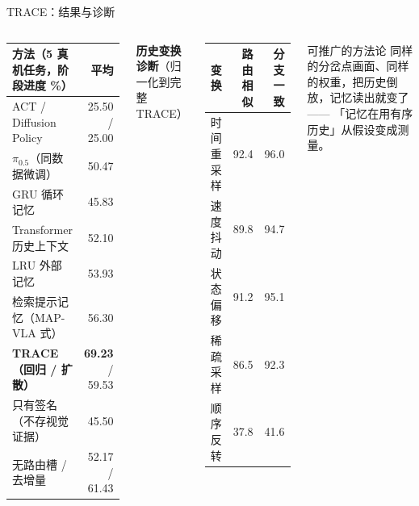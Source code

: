 \documentclass[aspectratio=169,10pt]{beamer}
\newcommand{\con}[1]{\textcolor{negative}{#1}}
\begin{document}
\begin{frame}{TRACE：结果与诊断}
\begin{columns}[T]
\vspace{4pt}
\begin{center}
\small
\begin{tabular}{@{}lr@{}}
\toprule
方法（5 真机任务，阶段进度 \%） & 平均 \\
\midrule
ACT / Diffusion Policy & 25.50 / 25.00 \\
$\pi_{0.5}$（同数据微调） & 50.47 \\
GRU 循环记忆 & 45.83 \\
Transformer 历史上下文 & 52.10 \\
LRU 外部记忆 & 53.93 \\
检索提示记忆（MAP-VLA 式） & 56.30 \\
\textbf{TRACE（回归 / 扩散）} & \textbf{69.23} / 59.53 \\
\midrule
只有签名（不存视觉证据） & 45.50 \\
无路由槽 / 去增量 & 52.17 / 61.43 \\
\bottomrule
\end{tabular}
\end{center}
\textbf{历史变换诊断}（归一化到完整 TRACE）
\begin{center}
\small
\begin{tabular}{@{}lrr@{}}
\toprule
变换 & 路由相似 & 分支一致 \\
\midrule
时间重采样 & 92.4 & 96.0 \\
速度抖动 & 89.8 & 94.7 \\
状态偏移 & 91.2 & 95.1 \\
稀疏采样 & 86.5 & 92.3 \\
\con{顺序反转} & \con{37.8} & \con{41.6} \\
\bottomrule
\end{tabular}
\end{center}
\begin{alertblock}{可推广的方法论}
同样的分岔点画面、同样的权重，把历史倒放，记忆读出就变了 —— 「记忆在用有序历史」从假设变成测量。
\end{alertblock}
\end{columns}
\end{frame}
\end{document}
